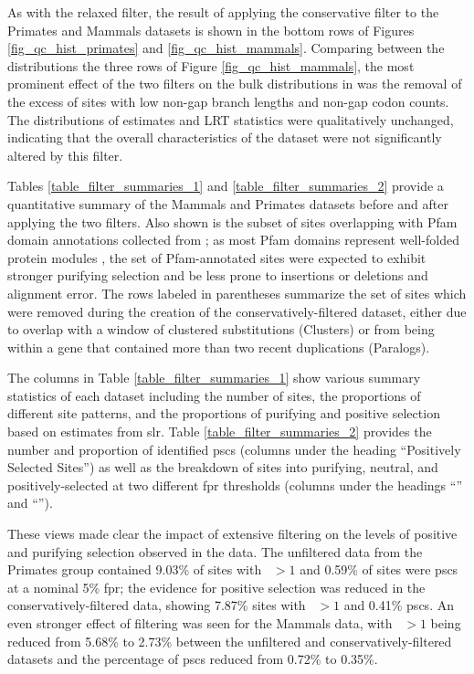 As with the relaxed filter, the result of applying the conservative
filter to the Primates and Mammals datasets is shown in the bottom
rows of Figures \ref{fig_qc_hist_primates} and
\ref{fig_qc_hist_mammals}. Comparing between the distributions the
three rows of Figure \ref{fig_qc_hist_mammals}, the most prominent
effect of the two filters on the bulk distributions in was the removal
of the excess of sites with low non-gap branch lengths and non-gap
codon counts. The distributions of \omgml estimates and LRT statistics
were qualitatively unchanged, indicating that the overall
characteristics of the dataset were not significantly altered by this
filter.

Tables \ref{table_filter_summaries_1} and
\ref{table_filter_summaries_2} provide a quantitative summary of the
Mammals and Primates datasets before and after applying the two
filters. Also shown is the subset of sites overlapping with Pfam
domain annotations collected from \ens; as most Pfam domains represent
well-folded protein modules \citep{Finn2010}, the set of
Pfam-annotated sites were expected to exhibit stronger purifying
selection and be less prone to insertions or deletions and alignment
error. The rows labeled in parentheses summarize the set of sites
which were removed during the creation of the conservatively-filtered
dataset, either due to overlap with a window of clustered
substitutions (Clusters) or from being within a gene that contained
more than two recent duplications (Paralogs).

The columns in Table \ref{table_filter_summaries_1} show various
summary statistics of each \sw dataset including the number of sites,
the proportions of different site patterns, and the proportions of
purifying and positive selection based on \omgml estimates from
\ac{slr}. Table \ref{table_filter_summaries_2} provides the number and
proportion of identified \acp{psc} (columns under the heading
``Positively Selected Sites'') as well as the breakdown of sites into
purifying, neutral, and positively-selected at two different \ac{fpr}
thresholds (columns under the headings ``'' and
``'').

These views made clear the impact of extensive filtering on the levels
of positive and purifying selection observed in the data. The
unfiltered data from the Primates group contained 9.03\% of sites with
\omgml~$>1$ and 0.59\% of sites were \acp{psc} at a nominal 5\%
\ac{fpr}; the evidence for positive selection was reduced in the
conservatively-filtered data, showing 7.87\% sites with \omgml~$>1$
and 0.41\% \acp{psc}. An even stronger effect of filtering was seen
for the Mammals data, with \omgml~$>1$ being reduced from 5.68\% to
2.73\% between the unfiltered and conservatively-filtered datasets and
the percentage of \acp{psc} reduced from 0.72\% to 0.35\%.

